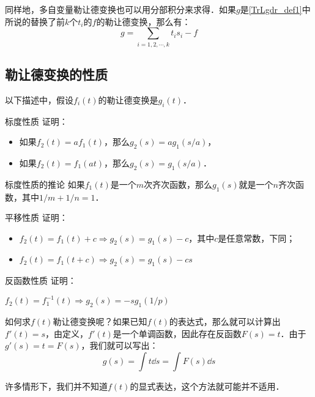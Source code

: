同样地，多自变量勒让德变换也可以用分部积分来求得．如果$g$是\autoref{TrLgdr_def1}中所说的替换了前$k$个$t_i$的$f$的勒让德变换，那么有：\begin{equation}
g=\sum\limits_{i=1,2,\cdots, k}t_is_i-f
\end{equation}

\subsection{勒让德变换的性质}

以下描述中，假设$f_i(t)$的勒让德变换是$g_i(t)$．

\begin{exercise}{标度性质}
证明：
\begin{itemize}
\item 如果$f_2(t)=af_1(t)$，那么$g_2(s)=ag_1(s/a)$，
\item 如果$f_2(t)=f_1(at)$，那么$g_2(s)=g_1(s/a)$．
\end{itemize}
\end{exercise}

\begin{corollary}{标度性质的推论}
如果$f_1(t)$是一个$m$次齐次函数，那么$g_1(s)$就是一个$n$齐次函数，其中$1/m+1/n=1$．
\end{corollary}

\begin{exercise}{平移性质}
证明：
\begin{itemize}
\item $f_2(t)=f_1(t)+c\Rightarrow g_2(s)=g_1(s)-c$，其中$c$是任意常数，下同；
\item $f_2(t)=f_1(t+c)\Rightarrow g_2(s)=g_1(s)-cs$
\end{itemize}
\end{exercise}

\begin{exercise}{反函数性质}
证明：

$f_2(t)=f_1^{-1}(t)\Rightarrow g_2(s)=-sg_1(1/p)$
\end{exercise}





如何求$f(t)$勒让德变换呢？如果已知$f(t)$的表达式，那么就可以计算出$f'(t)=s$，由定义，$f'(t)$是一个单调函数，因此存在反函数$F(s)=t$．由于$g'(s)=t=F(s)$，我们就可以写出：
\begin{equation}
g(s)=\int t \dd{s}=\int F(s) \dd{s}
\end{equation}

许多情形下，我们并不知道$f(t)$的显式表达，这个方法就可能并不适用．


